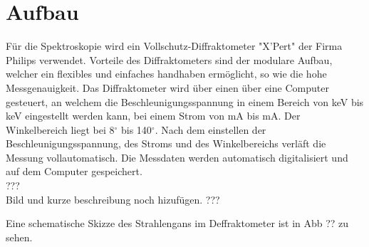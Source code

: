\section{Aufbau}
F\"ur die Spektroskopie wird ein Vollschutz-Diffraktometer "X'Pert" der Firma Philips verwendet.
Vorteile des Diffraktometers sind der modulare Aufbau, welcher ein flexibles und einfaches handhaben erm\"oglicht, so wie die hohe Messgenauigkeit.
Das Diffraktometer wird \"uber einen \"uber eine Computer gesteuert, an welchem die Beschleunigungsspannung in einem Bereich von \unit[15]{keV} bis \unit[50]{keV} eingestellt werden kann, bei einem Strom von \unit[5]{mA} bis \unit[36]{mA}.
Der Winkelbereich liegt bei 8$^\circ$ bis 140$^\circ$.
Nach dem einstellen der Beschleunigungsspannung, des Stroms und des Winkelbereichs verl\"aft die Messung vollautomatisch.
Die Messdaten werden automatisch digitalisiert und auf dem Computer gespeichert.
\\
??? \\
Bild und kurze beschreibung noch hizuf\"ugen.  \linebreak
??? \linebreak

Eine schematische Skizze des Strahlengans im Deffraktometer ist in Abb ?? zu sehen.
 
